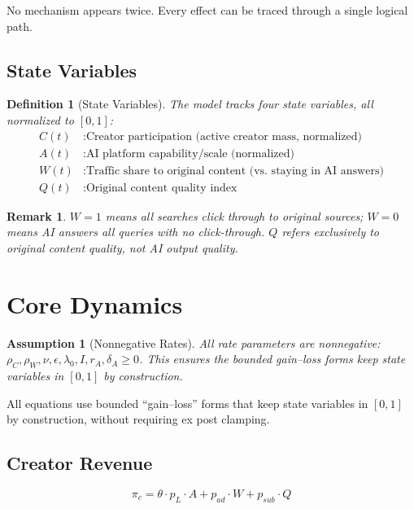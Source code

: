 \documentclass[11pt,a4paper]{article}
\newtheorem{definition}{Definition}
\newtheorem{assumption}{Assumption}
\newtheorem{remark}{Remark}
\begin{document}
No mechanism appears twice. Every effect can be traced through a single logical path.

\subsection{State Variables}

\begin{definition}[State Variables]
The model tracks four state variables, all normalized to $[0,1]$:
\begin{align}
C(t) &: \text{Creator participation (active creator mass, normalized)} \\
A(t) &: \text{AI platform capability/scale (normalized)} \\
W(t) &: \text{Traffic share to original content (vs.\ staying in AI answers)} \\
Q(t) &: \text{Original content quality index}
\end{align}
\end{definition}

\begin{remark}
$W = 1$ means all searches click through to original sources; $W = 0$ means AI answers all queries with no click-through. $Q$ refers exclusively to \emph{original} content quality, not AI output quality.
\end{remark}

\section{Core Dynamics}

\begin{assumption}[Nonnegative Rates]
All rate parameters are nonnegative: $\rho_C, \rho_W, \nu, \epsilon, \lambda_0, I, r_A, \delta_A \geq 0$. This ensures the bounded gain--loss forms keep state variables in $[0,1]$ by construction.
\end{assumption}

All equations use bounded ``gain--loss'' forms that keep state variables in $[0,1]$ by construction, without requiring ex post clamping.

\subsection{Creator Revenue}

\begin{equation}
\boxed{
\pi_c = \theta \cdot p_L \cdot A + p_{ad} \cdot W + p_{sub} \cdot Q
}
\end{equation}
\end{document}
